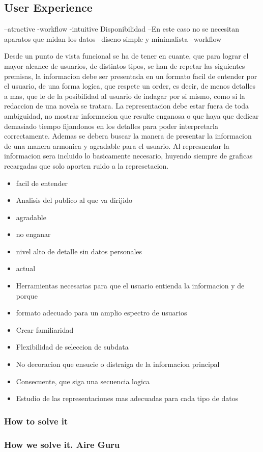 \subsection{User Experience}
 
--atractive
-workflow
-intuitive
Disponibilidad --En este caso no se necesitan aparatos que midan los datos
--diseno simple y minimalista
--workflow

Desde un punto de vista funcional se ha de tener en cuante, que para lograr el mayor alcance de usuarios, de distintos tipos, se han
de repetar las siguientes premisas,  la informacion debe ser presentada en un formato facil de entender por
el usuario, de una forma logica, que respete un order, es decir, de menos detalles a mas, que le de la posibilidad al usuario de indagar por si mismo, como
si la redaccion de una novela se tratara.
La representacion debe estar fuera de toda ambiguidad, no mostrar informacion que resulte enganosa o que haya que dedicar demasiado tiempo fijandonos
en los detalles para poder interpretarla correctamente.
Ademas se debera buscar la manera de presentar la informacion de una manera armonica y agradable para el usuario.
Al represnentar la informacion sera incluido lo basicamente necesario, huyendo siempre de graficas recargadas que solo aporten ruido a la represetacion.

\begin{itemize}
    \item facil de entender
    \item Analisis del publico al que va dirijido
    \item agradable
    \item no enganar
    \item nivel alto de detalle sin datos personales
    \item actual
    \item Herramientas necesarias para que el usuario entienda la informacion y de porque
    \item formato adecuado para un amplio espectro de usuarios
    \item Crear familiaridad
    \item Flexibilidad de seleccion de subdata
    \item No decoracion que ensucie o distraiga de la informacion principal
    \item Consecuente, que siga una secuencia logica
    \item Estudio de las representaciones mas adecuadas para cada tipo de datos
      \end{itemize}
    
\subsubsection{How to solve it} 


\subsubsection{How we solve it. Aire Guru} 
 
\begin{itemize}
    \done
    \crossed
    
\end{itemize}
\newpage